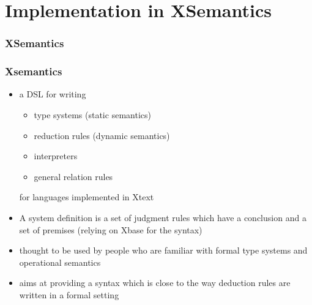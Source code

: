 \section[Xsemantics]{Implementation in XSemantics}

\begin{frame}
\frametitle{XSemantics}
\tableofcontents[currentsection]

\end{frame}

\begin{frame}
\frametitle{Xsemantics}

\begin{itemize}
  \item  a DSL for writing 
  \begin{itemize}
    \item type systems (static semantics)
    \item reduction rules (dynamic semantics)
    \item interpreters
    \item general relation rules
  \end{itemize}
  for languages implemented in Xtext
  \item A system definition is a set of judgment rules which have a
conclusion and a set of premises (relying on Xbase for the syntax)
  \item thought to be used by people who are familiar
with formal type systems and operational semantics
  \item aims at providing
a syntax which is close to the way deduction rules are written in a formal
setting
\end{itemize}

\end{frame}

